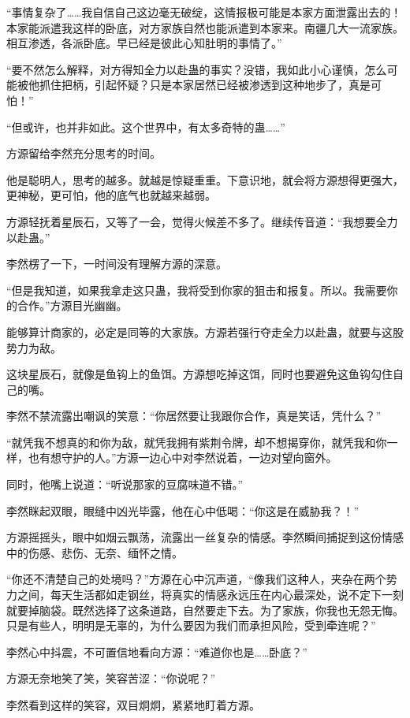 \begin{this_body}
“事情复杂了……我自信自己这边毫无破绽，这情报极可能是本家方面泄露出去的！本家能派遣我这样的卧底，对方家族自然也能派遣到本家来。南疆几大一流家族。相互渗透，各派卧底。早已经是彼此心知肚明的事情了。”

“要不然怎么解释，对方得知全力以赴蛊的事实？没错，我如此小心谨慎，怎么可能被他抓住把柄，引起怀疑？只是本家居然已经被渗透到这种地步了，真是可怕！”

“但或许，也并非如此。这个世界中，有太多奇特的蛊……”

方源留给李然充分思考的时间。

他是聪明人，思考的越多。就越是惊疑重重。下意识地，就会将方源想得更强大，更神秘，更可怕，他的底气也就越来越弱。

方源轻抚着星辰石，又等了一会，觉得火候差不多了。继续传音道：“我想要全力以赴蛊。”

李然楞了一下，一时间没有理解方源的深意。

“但是我知道，如果我拿走这只蛊，我将受到你家的狙击和报复。所以。我需要你的合作。”方源目光幽幽。

能够算计商家的，必定是同等的大家族。方源若强行夺走全力以赴蛊，就要与这股势力为敌。

这块星辰石，就像是鱼钩上的鱼饵。方源想吃掉这饵，同时也要避免这鱼钩勾住自己的嘴。

李然不禁流露出嘲讽的笑意：“你居然要让我跟你合作，真是笑话，凭什么？”

“就凭我不想真的和你为敌，就凭我拥有紫荆令牌，却不想揭穿你，就凭我和你一样，也有想守护的人。”方源一边心中对李然说着，一边对望向窗外。

同时，他嘴上说道：“听说那家的豆腐味道不错。”

李然眯起双眼，眼缝中凶光毕露，他在心中低喝：“你这是在威胁我？！”

方源摇摇头，眼中如烟云飘荡，流露出一丝复杂的情感。李然瞬间捕捉到这份情感中的伤感、悲伤、无奈、缅怀之情。

“你还不清楚自己的处境吗？”方源在心中沉声道，“像我们这种人，夹杂在两个势力之间，每天生活都如走钢丝，将真实的情感永远压在内心最深处，说不定下一刻就要掉脑袋。既然选择了这条道路，自然要走下去。为了家族，你我也无怨无悔。只是有些人，明明是无辜的，为什么要因为我们而承担风险，受到牵连呢？”

李然心中抖震，不可置信地看向方源：“难道你也是……卧底？”

方源无奈地笑了笑，笑容苦涩：“你说呢？”

李然看到这样的笑容，双目炯炯，紧紧地盯着方源。


\end{this_body}
